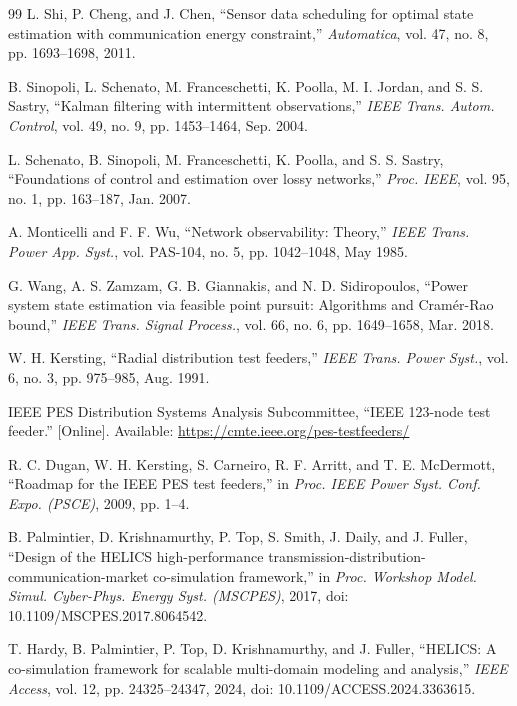 \documentclass[journal]{IEEEtran}
\theoremstyle{plain}
\theoremstyle{definition}
\theoremstyle{remark}
\begin{document}
\begin{thebibliography}{99}
 L. Shi, P. Cheng, and J. Chen, ``Sensor data scheduling for optimal state estimation with communication energy constraint,'' \emph{Automatica}, vol. 47, no. 8, pp. 1693--1698, 2011.

 B. Sinopoli, L. Schenato, M. Franceschetti, K. Poolla, M. I. Jordan, and S. S. Sastry, ``Kalman filtering with intermittent observations,'' \emph{IEEE Trans. Autom. Control}, vol. 49, no. 9, pp. 1453--1464, Sep. 2004.

 L. Schenato, B. Sinopoli, M. Franceschetti, K. Poolla, and S. S. Sastry, ``Foundations of control and estimation over lossy networks,'' \emph{Proc. IEEE}, vol. 95, no. 1, pp. 163--187, Jan. 2007.

 A. Monticelli and F. F. Wu, ``Network observability: Theory,'' \emph{IEEE Trans. Power App. Syst.}, vol. PAS-104, no. 5, pp. 1042--1048, May 1985.

 G. Wang, A. S. Zamzam, G. B. Giannakis, and N. D. Sidiropoulos, ``Power system state estimation via feasible point pursuit: Algorithms and Cram\'{e}r-Rao bound,'' \emph{IEEE Trans. Signal Process.}, vol. 66, no. 6, pp. 1649--1658, Mar. 2018.

 W. H. Kersting, ``Radial distribution test feeders,'' \emph{IEEE Trans. Power Syst.}, vol. 6, no. 3, pp. 975--985, Aug. 1991.

 IEEE PES Distribution Systems Analysis Subcommittee, ``IEEE 123-node test feeder.'' [Online]. Available: \url{https://cmte.ieee.org/pes-testfeeders/}

 R. C. Dugan, W. H. Kersting, S. Carneiro, R. F. Arritt, and T. E. McDermott, ``Roadmap for the IEEE PES test feeders,'' in \emph{Proc. IEEE Power Syst. Conf. Expo. (PSCE)}, 2009, pp. 1--4.

 B. Palmintier, D. Krishnamurthy, P. Top, S. Smith, J. Daily, and J. Fuller, ``Design of the HELICS high-performance transmission-distribution-communication-market co-simulation framework,'' in \emph{Proc. Workshop Model. Simul. Cyber-Phys. Energy Syst. (MSCPES)}, 2017, doi: 10.1109/MSCPES.2017.8064542.

 T. Hardy, B. Palmintier, P. Top, D. Krishnamurthy, and J. Fuller, ``HELICS: A co-simulation framework for scalable multi-domain modeling and analysis,'' \emph{IEEE Access}, vol. 12, pp. 24325--24347, 2024, doi: 10.1109/ACCESS.2024.3363615.


\end{thebibliography}
\end{document}
